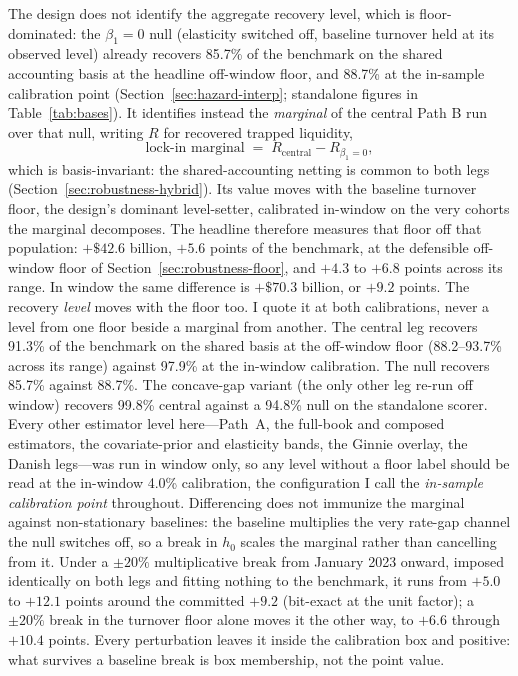 \documentclass[12pt]{article}
\begin{document}
The design does not identify the aggregate recovery level, which is floor-dominated: the $\beta_1 = 0$ null (elasticity switched off, baseline turnover held at its observed level) already recovers 85.7\% of the benchmark on the shared accounting basis at the headline off-window floor, and 88.7\% at the in-sample calibration point (Section~\ref{sec:hazard-interp}; standalone figures in Table~\ref{tab:bases}). It identifies instead the \emph{marginal} of the central Path B run over that null, writing $R$ for recovered trapped liquidity,
\begin{equation}\label{eq:marginal}
\text{lock-in marginal} \;=\; R_{\text{central}} - R_{\beta_1 = 0},
\end{equation}
which is basis-invariant: the shared-accounting netting is common to both legs (Section~\ref{sec:robustness-hybrid}). Its value moves with the baseline turnover floor, the design's dominant level-setter, calibrated in-window on the very cohorts the marginal decomposes. The headline therefore measures that floor off that population: $+\$42.6$ billion, $+5.6$ points of the benchmark, at the defensible off-window floor of Section~\ref{sec:robustness-floor}, and $+4.3$ to $+6.8$ points across its range. In window the same difference is $+\$70.3$ billion, or $+9.2$ points. The recovery \emph{level} moves with the floor too. I quote it at both calibrations, never a level from one floor beside a marginal from another. The central leg recovers 91.3\% of the benchmark on the shared basis at the off-window floor (88.2--93.7\% across its range) against 97.9\% at the in-window calibration. The null recovers 85.7\% against 88.7\%. The concave-gap variant (the only other leg re-run off window) recovers 99.8\% central against a 94.8\% null on the standalone scorer. Every other estimator level here---Path~A, the full-book and composed estimators, the covariate-prior and elasticity bands, the Ginnie overlay, the Danish legs---was run in window only, so any level without a floor label should be read at the in-window 4.0\% calibration, the configuration I call the \emph{in-sample calibration point} throughout. Differencing does not immunize the marginal against non-stationary baselines: the baseline multiplies the very rate-gap channel the null switches off, so a break in $h_0$ scales the marginal rather than cancelling from it. Under a $\pm 20\%$ multiplicative break from January 2023 onward, imposed identically on both legs and fitting nothing to the benchmark, it runs from $+5.0$ to $+12.1$ points around the committed $+9.2$ (bit-exact at the unit factor); a $\pm 20\%$ break in the turnover floor alone moves it the other way, to $+6.6$ through $+10.4$ points. Every perturbation leaves it inside the calibration box and positive: what survives a baseline break is box membership, not the point value.
\end{document}
